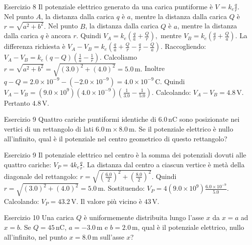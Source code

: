 \documentclass[a4paper]{article}
\begin{document}
\begin{snippetsolution}{Esercizio 8}
    Il potenziale elettrico generato da una carica puntiforme è
    \(V = k_e\frac{q}{r}.\)
    Nel punto \(A\), la distanza dalla carica \(q\) è \(a\), mentre la distanza
    dalla carica \(Q\) è
    \(r = \sqrt{a^2 + b^2}.\)
    Nel punto \(B\), la distanza dalla carica \(Q\) è \(a\), mentre la distanza
    dalla carica \(q\) è ancora \(r\).
    Quindi
    \(V_A = k_e \left( \frac{q}{a} + \frac{Q}{r} \right),\)
    mentre
    \(V_B = k_e \left( \frac{q}{r} + \frac{Q}{a} \right).\)
    La differenza richiesta è
    \(V_A - V_B = k_e \left( \frac{q}{a} + \frac{Q}{r} - \frac{q}{r} - \frac{Q}{a} \right).\)
    Raccogliendo:
    \(V_A - V_B = k_e(q-Q) \left( \frac{1}{a} - \frac{1}{r} \right).\)
    Calcoliamo
    \(r = \sqrt{a^2 + b^2} = \sqrt{(3.0)^2 + (4.0)^2} = 5.0\,\mathrm{m}.\)
    Inoltre
    \(q - Q = 2.0 \times 10^{-9} - \left(-2.0 \times 10^{-9}\right) = 4.0 \times 10^{-9}\,\mathrm{C}.\)
    Quindi
    \(V_A - V_B = \left(9.0 \times 10^9\right) \left(4.0 \times 10^{-9}\right) \left( \frac{1}{3.0} - \frac{1}{5.0} \right).\)
    Calcolando:
    \(V_A - V_B = 4.8\,\mathrm{V}.\)
    Pertanto
    \(\boxed{4.8\,\mathrm{V}}.\)
\end{snippetsolution}
\begin{snippetexercise}{Esercizio 9}
    Quattro cariche puntiformi identiche di \(6.0\,\mathrm{nC}\) sono
    posizionate nei vertici di un rettangolo di lati
    \(6.0\,\mathrm{m} \times 8.0\,\mathrm{m}\). Se il potenziale elettrico è
    nullo all'infinito, qual è il potenziale nel centro geometrico di questo
    rettangolo?

\end{snippetexercise}
\begin{snippetsolution}{Esercizio 9}
    Il potenziale elettrico nel centro è la somma dei potenziali dovuti alle
    quattro cariche:
    \(V_P = 4k_e\frac{q}{r}.\)
    La distanza dal centro a ciascun vertice è metà della diagonale del
    rettangolo:
    \(r = \sqrt{ \left(\frac{6.0}{2}\right)^2 + \left(\frac{8.0}{2}\right)^2 }.\)
    Quindi
    \(r = \sqrt{(3.0)^2 + (4.0)^2} = 5.0\,\mathrm{m}.\)
    Sostituendo:
    \(V_P = 4 \left(9.0 \times 10^9\right) \frac{6.0 \times 10^{-9}}{5.0}.\)
    Calcolando:
    \(V_P = 43.2\,\mathrm{V}.\)
    Il valore più vicino è
    \(\boxed{43\,\mathrm{V}}.\)
\end{snippetsolution}
\begin{snippetexercise}{Esercizio 10}
    Una carica \(Q\) è uniformemente distribuita lungo l'asse \(x\) da
    \(x = a\) ad \(x = b\). Se \(Q = 45\,\mathrm{nC}\),
    \(a = -3.0\,\mathrm{m}\) e \(b = 2.0\,\mathrm{m}\), qual è il potenziale
    elettrico, nullo all'infinito, nel punto \(x = 8.0\,\mathrm{m}\) sull'asse
    \(x\)?

\end{snippetexercise}
\end{document}
